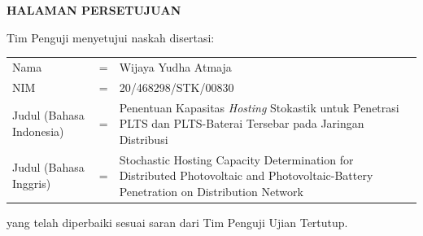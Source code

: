 \BgThispage
\centerline{\fontsize{14}{16}\textbf{HALAMAN PERSETUJUAN}}
\vspace*{27pt}
\noindent Tim Penguji menyetujui naskah disertasi:
\vspace*{-8pt}
{
\begin{longtable}{llp{244pt}}
	\hspace*{-6pt}Nama						& = & Wijaya Yudha Atmaja\\
	\hspace*{-6pt}NIM						& = & 20/468298/STK/00830\\
	\hspace*{-6pt}Judul (Bahasa Indonesia)	& = & Penentuan Kapasitas \textit{Hosting} Stokastik untuk Penetrasi PLTS dan PLTS-Baterai Tersebar pada Jaringan Distribusi\\
	\hspace*{-6pt}Judul	(Bahasa Inggris) 	& = & Stochastic Hosting Capacity Determination for Distributed Photovoltaic and Photovoltaic-Battery Penetration on Distribution Network
\end{longtable}
}
\vspace*{-22pt}
\noindent yang telah diperbaiki sesuai saran dari Tim Penguji Ujian Tertutup.

